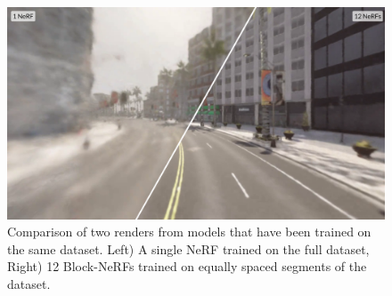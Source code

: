 \begin{figure}[!h]
    \centering
    \includegraphics[width=1.0\textwidth]{figures/block-nerf-comparison.png}
    \caption[Comparison of regular NeRF vs. the naive Block-NeRF approach]{Comparison of two renders from models that have been trained on the same dataset. Left) A single NeRF trained on the full dataset, Right) 12 Block-NeRFs trained on equally spaced segments of the dataset.}
    \label{fig:block-nerf-comparison}
\end{figure}